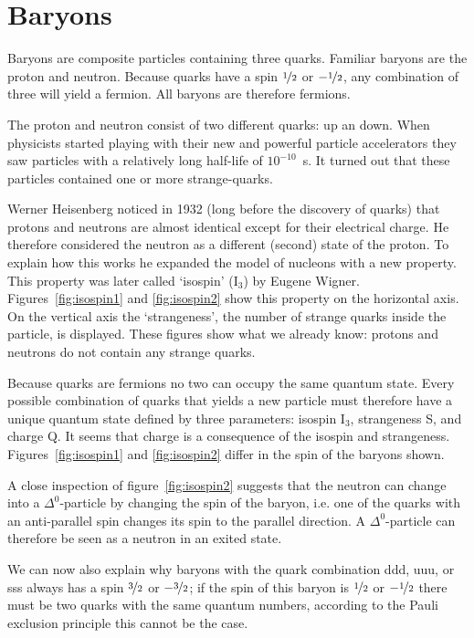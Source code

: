 \documentclass[12pt,a4paper]{article}
\numberwithin{equation}{section}
\numberwithin{figure}{section}
\numberwithin{table}{section}
\begin{document}
\section{Baryons}
Baryons are composite particles containing three quarks. Familiar baryons are the proton and neutron. Because quarks have a spin $\nicefrac{1}{2}$ or $-\nicefrac{1}{2}$, any combination of three will yield a fermion. All baryons are therefore fermions.

The proton and neutron consist of two different quarks: up an down. When physicists started playing with their new and powerful particle accelerators they saw particles with a relatively long half-life of $10^{-10}$~s. It turned out that these particles contained one or more strange-quarks.

Werner Heisenberg noticed in 1932 (long before the discovery of quarks) that protons and neutrons are almost identical except for their electrical charge. He therefore considered the neutron as a different (second) state of the proton. To explain how this works he expanded the model of nucleons with a new property. This property was later called `isospin' (I$_3$) by Eugene Wigner. Figures~\ref{fig:isospin1} and \ref{fig:isospin2} show this property on the horizontal axis. On the vertical axis the `strangeness', the number of strange quarks inside the particle, is displayed. These figures show what we already know: protons and neutrons do not contain any strange quarks.

Because quarks are fermions no two can occupy the same quantum state. Every possible combination of quarks that yields a new particle must therefore have a unique quantum state defined by three parameters: isospin I$_3$, strangeness S, and charge Q. It seems that charge is a consequence of the isospin and strangeness. Figures~\ref{fig:isospin1} and \ref{fig:isospin2} differ in the spin of the baryons shown.

A close inspection of figure~\ref{fig:isospin2} suggests that the neutron can change into a $\Delta^0$-particle by changing the spin of the baryon, i.e. one of the quarks with an anti-parallel spin changes its spin to the parallel direction. A $\Delta^0$-particle can therefore be seen as a neutron in an exited state.

We can now also explain why baryons with the quark combination ddd, uuu, or sss always has a spin $\nicefrac{3}{2}$ or $-\nicefrac{3}{2}$; if the spin of this baryon is $\nicefrac{1}{2}$ or $-\nicefrac{1}{2}$ there must be two quarks with the same quantum numbers, according to the Pauli exclusion principle this cannot be the case.
\end{document}
